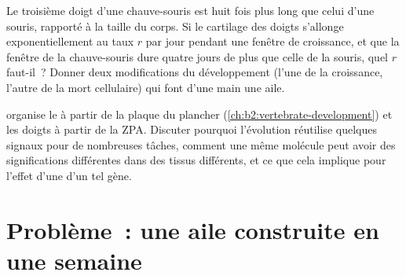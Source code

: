 \begin{exercise}[$\star\star\star$]\label{exo:b2:limb-organogenesis:11}
Le troisième doigt d'une chauve-souris est huit fois plus long que
celui d'une souris, rapporté à la taille du corps. Si le cartilage des
doigts s'allonge exponentiellement au taux $r$ par jour pendant une
fenêtre de croissance, et que la fenêtre de la chauve-souris dure quatre
jours de plus que celle de la souris, quel $r$ faut-il~? Donner deux
modifications du développement (l'une de la croissance, l'autre de la
mort cellulaire) qui font d'une main une aile.
\end{exercise}

\begin{exercise}[$\star\star\star$]\label{exo:b2:limb-organogenesis:12}
 organise le  à partir de la plaque du plancher
(\cref{ch:b2:vertebrate-development}) et les doigts à partir de la ZPA.
Discuter pourquoi l'évolution réutilise quelques signaux pour de
nombreuses tâches, comment une même molécule peut avoir des
significations différentes dans des tissus différents, et ce que cela
implique pour l'effet d'une  d'un tel gène.
\end{exercise}

\section{Problème~: une aile construite en une semaine}

